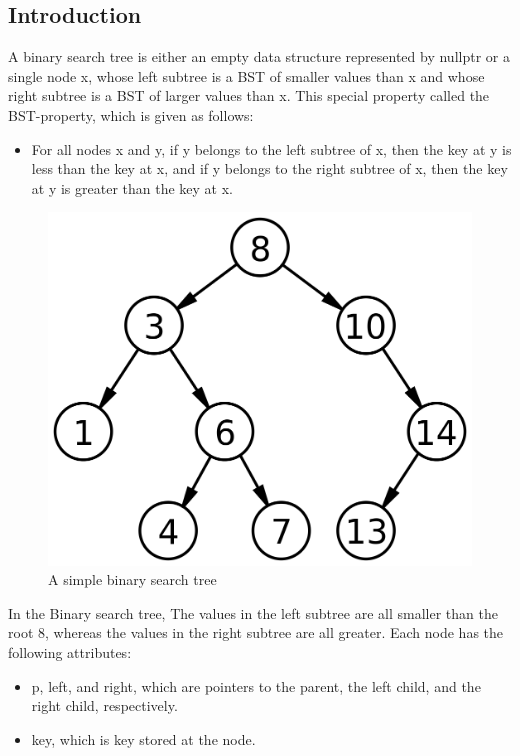 \documentclass[11pt]{article}
\begin{document}
    \subsection{Introduction}
    A binary search tree is either an empty data structure represented by nullptr or a single node x, whose left subtree is a BST of smaller values than x and whose right subtree is a BST of larger values than x. This special property called the BST-property, which is given as follows:
    
    \begin{itemize}
        \item For all nodes x and y, if y belongs to the left subtree of x, then the key at y is less than the key at x, and if y belongs to the right subtree of x, then the key at y is greater than the key at x.
    \end{itemize}
    
    \begin{figure}[htbp]
        \center
        \includegraphics[scale=0.2]{bstexample.png}
        \caption{A simple binary search tree}
    \end{figure}
    
    In the Binary search tree, The values in the left subtree are all smaller than the root 8, whereas the values in the right subtree are all greater. Each node has the following attributes:
    \begin{itemize}
        \item p, left, and right, which are pointers to the
    parent, the left child, and the right child,
    respectively.
    \item key, which is key stored at the node.
    \end{itemize}
\end{document}

